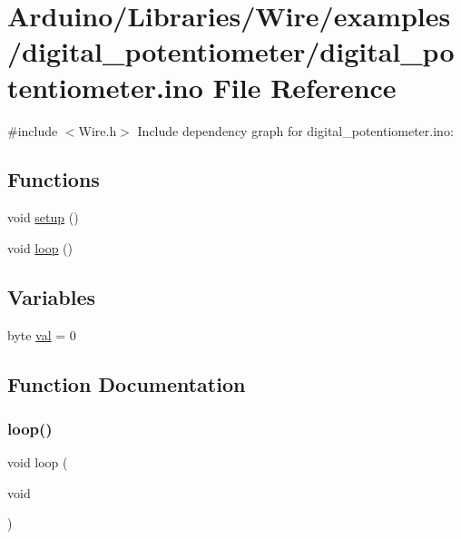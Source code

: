 \hypertarget{digital__potentiometer_8ino}{}\section{Arduino/\+Libraries/\+Wire/examples/digital\+\_\+potentiometer/digital\+\_\+potentiometer.ino File Reference}
\label{digital__potentiometer_8ino}
{\ttfamily \#include $<$Wire.\+h$>$}\newline
Include dependency graph for digital\+\_\+potentiometer.\+ino\+:
\subsection*{Functions}
\begin{DoxyCompactItemize}
\item 
void \hyperlink{digital__potentiometer_8ino_a4fc01d736fe50cf5b977f755b675f11d}{setup} ()
\item 
void \hyperlink{digital__potentiometer_8ino_afe461d27b9c48d5921c00d521181f12f}{loop} ()
\end{DoxyCompactItemize}
\subsection*{Variables}
\begin{DoxyCompactItemize}
\item 
byte \hyperlink{digital__potentiometer_8ino_a16320c53315e64553b7cb52d27733783}{val} = 0
\end{DoxyCompactItemize}


\subsection{Function Documentation}
\mbox{\label{digital__potentiometer_8ino_afe461d27b9c48d5921c00d521181f12f}} 
\subsubsection{\texorpdfstring{loop()}{loop()}}
{\footnotesize\ttfamily void loop (\begin{DoxyParamCaption}\item[{void}]{ }\end{DoxyParamCaption})}

